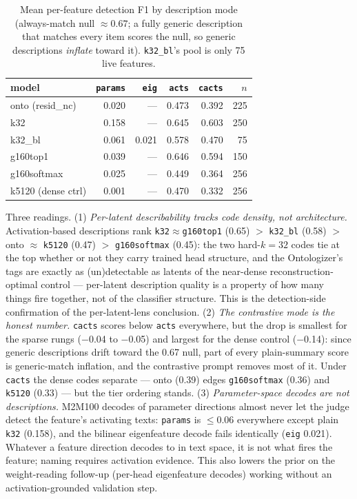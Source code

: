 \documentclass[11pt]{article}
\begin{document}
\begin{table}[h]\centering\small
\begin{tabular}{@{}lrrrrr@{}}
\toprule
model & \texttt{params} & \texttt{eig} & \texttt{acts} & \texttt{cacts} & $n$ \\
\midrule
onto (resid\_nc)   & 0.020 & ---   & 0.473 & 0.392 & 225 \\
k32                & 0.158 & ---   & 0.645 & 0.603 & 250 \\
k32\_bl            & 0.061 & 0.021 & 0.578 & 0.470 & 75 \\
g160top1           & 0.039 & ---   & 0.646 & 0.594 & 150 \\
g160softmax        & 0.025 & ---   & 0.449 & 0.364 & 256 \\
k5120 (dense ctrl) & 0.001 & ---   & 0.470 & 0.332 & 256 \\
\bottomrule
\end{tabular}
\caption{Mean per-feature detection F1 by description mode
(always-match null $\approx 0.67$; a fully generic description that
matches every item scores the null, so generic descriptions
\emph{inflate} toward it). \texttt{k32\_bl}'s pool is only 75 live
features.}
\end{table}

Three readings. (1) \emph{Per-latent describability tracks code density,
not architecture.} Activation-based descriptions rank
\texttt{k32}${\approx}$\texttt{g160top1} (0.65) $>$ \texttt{k32\_bl}
(0.58) $>$ onto ${\approx}$ \texttt{k5120} (0.47) $>$
\texttt{g160softmax} (0.45): the two hard-$k{=}32$ codes tie at the top
whether or not they carry trained head structure, and the Ontologizer's
tags are exactly as (un)detectable as latents of the near-dense
reconstruction-optimal control --- per-latent description quality is a
property of how many things fire together, not of the classifier
structure. This is the detection-side confirmation of the per-latent-lens
conclusion. (2) \emph{The contrastive mode is the honest number.}
\texttt{cacts} scores below \texttt{acts} everywhere, but the drop is
smallest for the sparse rungs ($-$0.04 to $-$0.05) and largest for the
dense control ($-$0.14): since generic descriptions drift toward the
0.67 null, part of every plain-summary score is generic-match inflation,
and the contrastive prompt removes most of it. Under \texttt{cacts} the
dense codes separate --- onto (0.39) edges \texttt{g160softmax} (0.36)
and \texttt{k5120} (0.33) --- but the tier ordering stands. (3)
\emph{Parameter-space decodes are not descriptions.} M2M100 decodes of
parameter directions almost never let the judge detect the feature's
activating texts: \texttt{params} is ${\le}0.06$ everywhere except plain
\texttt{k32} (0.158), and the bilinear eigenfeature decode fails
identically (\texttt{eig} 0.021). Whatever a feature direction decodes
to in text space, it is not what fires the feature; naming requires
activation evidence. This also lowers the prior on the weight-reading
follow-up (per-head eigenfeature decodes) working without an
activation-grounded validation step.
\end{document}
